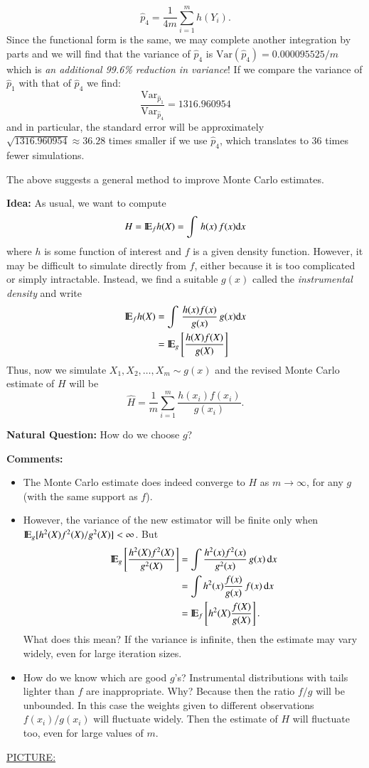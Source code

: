 \documentclass[captions=tableheading]{scrbook}
\begin{document}
\begin{enumerate}
  \[
  \hat{p}_{4} = \frac{1}{4m}\sum_{i=1}^{m} h(Y_{i}).
  \]
  Since the functional form is the same, we may complete another integration by parts and we will find that the variance of $\hat{p}_{4}$ is $\mbox{Var}(\hat{p}_{4})=0.000095525/m$ which is \emph{an additional 99.6\% reduction in variance}! If we compare the variance of $\hat{p}_{1}$ with that of $\hat{p}_{4}$ we find: 
  \[
  \frac{\mathrm{Var}_{\hat{p}_{1}}}{\mathrm{Var}_{\hat{p}_{4}}}=1316.960954
  \]
  and in particular, the standard error will be approximately $\sqrt{1316.960954}\approx 36.28$ times smaller if we use $\hat{p}_{4}$, which translates to 36 times fewer simulations.
\end{enumerate}
The above suggests a general method to improve Monte Carlo estimates.

\textbf{Idea:} As usual, we want to compute 
\[
H = \mathrm{I\hspace{-1.5pt}E}_{f}h(X) = \int\, h(x)\, f(x)\mathrm{d} x
\]
where $h$ is some function of interest and $f$ is a given density function. However, it may be difficult to simulate directly from $f$, either because it is too complicated or simply intractable. Instead, we find a suitable $g(x)$ called the \emph{instrumental density} and write 
\begin{align*}
\mathrm{I\hspace{-1.5pt}E}_{f}h(X) & =\int\,\frac{h(x)f(x)}{g(x)}\, g(x)\mathrm{d} x\\
 & =\mathrm{I\hspace{-1.5pt}E}_{g}\left[\frac{h(X)f(X)}{g(X)}\right]
\end{align*}
Thus, now we simulate \(X_{1},X_{2},\ldots,X_{m}\sim g(x)\) and the revised Monte Carlo estimate of $H$ will be 
\[
\hat{H} = \frac{1}{m}\sum_{i=1}^{m}\frac{h(x_{i})f(x_{i})}{g(x_{i})}.
\]


\textbf{Natural Question:} How do we choose $g$?

\textbf{Comments:}


\begin{itemize}
\item The Monte Carlo estimate does indeed converge to $H$ as $m \to \infty$, for any $g$ (with the same support as $f$).
\item However, the variance of the new estimator will be finite only when $\mathrm{I\hspace{-1.5pt}E}_{g}[h^{2}(X)f^{2}(X)/g^{2}(X)] < \infty$. But 
   \begin{align*}
   \mathrm{I\hspace{-1.5pt}E}_{g}\left[\frac{h^{2}(X)f^{2}(X)}{g^{2}(X)}\right] & =\int\frac{h^{2}(x)f^{2}(x)}{g^{2}(x)}\, g(x)\,\mathrm{d} x\\
   & =\int h^{2}(x)\frac{f(x)}{g(x)}\, f(x)\,\mathrm{d} x\\
   & =\mathrm{I\hspace{-1.5pt}E}_{f}\left[h^{2}(X)\frac{f(X)}{g(X)}\right].
   \end{align*}
   What does this mean? If the variance is infinite, then the estimate may vary widely, even for large iteration sizes.
\item How do we know which are good $g$'s? Instrumental distributions with tails lighter than $f$ are inappropriate. Why? Because then the ratio $f/g$ will be unbounded. In this case the weights given to different observations $f(x_{i})/g(x_{i})$ will fluctuate widely. Then the estimate of $H$ will fluctuate too, even for large values of $m$.
\end{itemize}
\underline{PICTURE:} 
\end{document}
